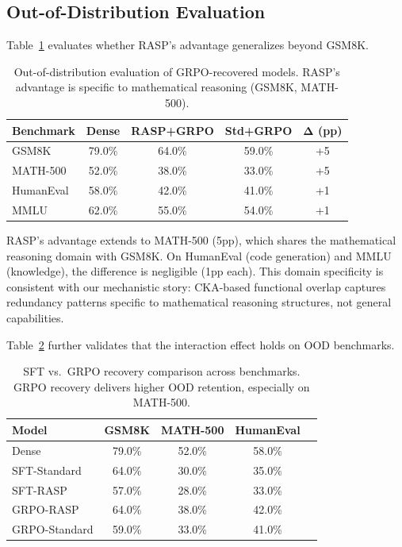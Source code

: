 \documentclass[11pt]{article}
\begin{document}
\subsection{Out-of-Distribution Evaluation}
\label{sec:ood}

Table~\ref{tab:ood} evaluates whether RASP's advantage generalizes beyond GSM8K.

\begin{table}[t]
\centering
\caption{Out-of-distribution evaluation of GRPO-recovered models. RASP's advantage is specific to mathematical reasoning (GSM8K, MATH-500).}
\label{tab:ood}
\begin{tabular}{lcccc}
\toprule
\textbf{Benchmark} & \textbf{Dense} & \textbf{RASP+GRPO} & \textbf{Std+GRPO} & $\boldsymbol{\Delta}$ \textbf{(pp)} \\
\midrule
GSM8K & 79.0\% & 64.0\% & 59.0\% & +5 \\
MATH-500 & 52.0\% & 38.0\% & 33.0\% & +5 \\
HumanEval & 58.0\% & 42.0\% & 41.0\% & +1 \\
MMLU & 62.0\% & 55.0\% & 54.0\% & +1 \\
\bottomrule
\end{tabular}
\end{table}

RASP's advantage extends to MATH-500 (5pp), which shares the mathematical reasoning domain with GSM8K. On HumanEval (code generation) and MMLU (knowledge), the difference is negligible (1pp each). This domain specificity is consistent with our mechanistic story: CKA-based functional overlap captures redundancy patterns specific to mathematical reasoning structures, not general capabilities.

Table~\ref{tab:sft_ood} further validates that the interaction effect holds on OOD benchmarks.

\begin{table}[t]
\centering
\caption{SFT vs.\ GRPO recovery comparison across benchmarks. GRPO recovery delivers higher OOD retention, especially on MATH-500.}
\label{tab:sft_ood}
\begin{tabular}{lcccc}
\toprule
\textbf{Model} & \textbf{GSM8K} & \textbf{MATH-500} & \textbf{HumanEval} \\
\midrule
Dense & 79.0\% & 52.0\% & 58.0\% \\
SFT-Standard & 64.0\% & 30.0\% & 35.0\% \\
SFT-RASP & 57.0\% & 28.0\% & 33.0\% \\
GRPO-RASP & 64.0\% & 38.0\% & 42.0\% \\
GRPO-Standard & 59.0\% & 33.0\% & 41.0\% \\
\bottomrule
\end{tabular}
\end{table}
\end{document}
